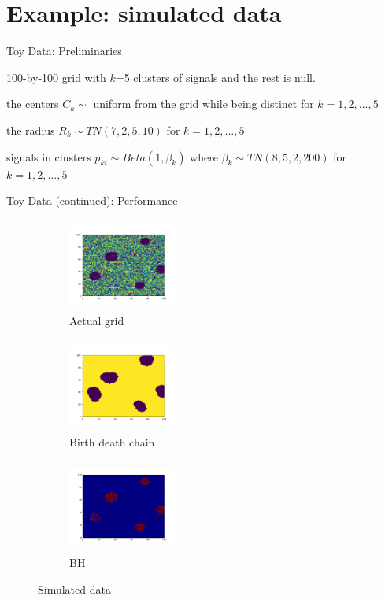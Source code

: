 \documentclass[10pt,mathserif]{beamer}
\begin{document}
\section{Example: simulated data} 

\begin{frame} {Toy Data: Preliminaries}
\BIT
\item 100-by-100 grid with $k$=5 clusters of signals and the rest is null.
\item the centers $C_k \sim$  uniform from the grid while being distinct for $k = 1, 2, ..., 5$
\item the radius $R_k \sim T N (7, 2, 5, 10)$ for $k = 1, 2, ..., 5$
\item signals in clusters $p_{ki} \sim Beta(1, \beta_k)$ where $\beta_k \sim TN(8, 5, 2, 200)$ for $k = 1, 2, ..., 5$
\EIT
\end{frame}

\begin{frame} {Toy Data (continued): Performance }
\begin{figure}[t!]
    \centering
    \begin{subfigure}[t]{0.3\textwidth}
        \centering
        \includegraphics[height=1.2in, width=1.4in]{../BDC_gridactual}
        \caption{Actual grid}
    \end{subfigure}%
    \begin{subfigure}[t]{0.3\textwidth}
        \centering
        \includegraphics[height=1.2in, width=1.4in]{../BDC_grid1}
        \caption{Birth death chain}
    \end{subfigure}%
    \begin{subfigure}[t]{0.3\textwidth}
        \centering
        \includegraphics[height=1.2in, width=1.4in]{../BH_toy_data}
        \caption{BH}
    \end{subfigure}
    \caption{Simulated data}
\end{figure}
\end{frame}
\end{document}
